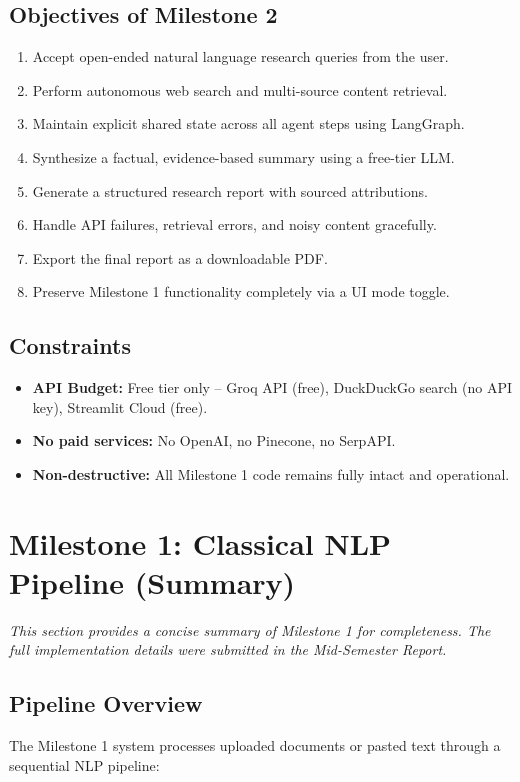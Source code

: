 \documentclass[12pt, a4paper]{article}
\begin{document}
\subsection{Objectives of Milestone 2}
\begin{enumerate}
  \item Accept open-ended natural language research queries from the user.
  \item Perform autonomous web search and multi-source content retrieval.
  \item Maintain explicit shared state across all agent steps using LangGraph.
  \item Synthesize a factual, evidence-based summary using a free-tier LLM.
  \item Generate a structured research report with sourced attributions.
  \item Handle API failures, retrieval errors, and noisy content gracefully.
  \item Export the final report as a downloadable PDF.
  \item Preserve Milestone 1 functionality completely via a UI mode toggle.
\end{enumerate}

\subsection{Constraints}
\begin{itemize}
  \item \textbf{API Budget:} Free tier only -- Groq API (free), DuckDuckGo search (no API key), Streamlit Cloud (free).
  \item \textbf{No paid services:} No OpenAI, no Pinecone, no SerpAPI.
  \item \textbf{Non-destructive:} All Milestone 1 code remains fully intact and operational.
\end{itemize}

\section{Milestone 1: Classical NLP Pipeline (Summary)}

\textit{This section provides a concise summary of Milestone 1 for completeness. The full implementation details were submitted in the Mid-Semester Report.}

\subsection{Pipeline Overview}
The Milestone 1 system processes uploaded documents or pasted text through a sequential NLP pipeline:
\end{document}
